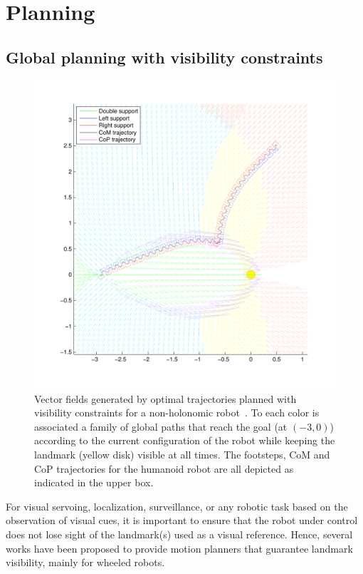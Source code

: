 \chapter{Planning} 
\label{Chap:Visual-Planning}

\section{Global planning with visibility constraints}

\label{sec:globalplanning}

\begin{figure}[h]
\centering
\includegraphics[scale=0.425]{figures/steps6.pdf}
\caption{Vector fields generated by optimal trajectories planned with visibility constraints for a non-holonomic robot~\cite{Salaris:2010}. To each color is associated a family of global paths that reach the goal (at $(-3,0)$) according to the current configuration of the robot while keeping the landmark (yellow disk) visible at all times. The footsteps, CoM and CoP trajectories for the humanoid robot are all depicted as indicated in the upper box.}
\label{fig:steps6}
\end{figure}

For visual servoing, localization, surveillance, or any robotic task based on the observation of visual cues, it is important to ensure that the robot under control does not lose sight of the landmark(s) used as a visual reference. Hence, several works have been proposed to provide motion planners that guarantee landmark visibility, mainly for wheeled robots.

